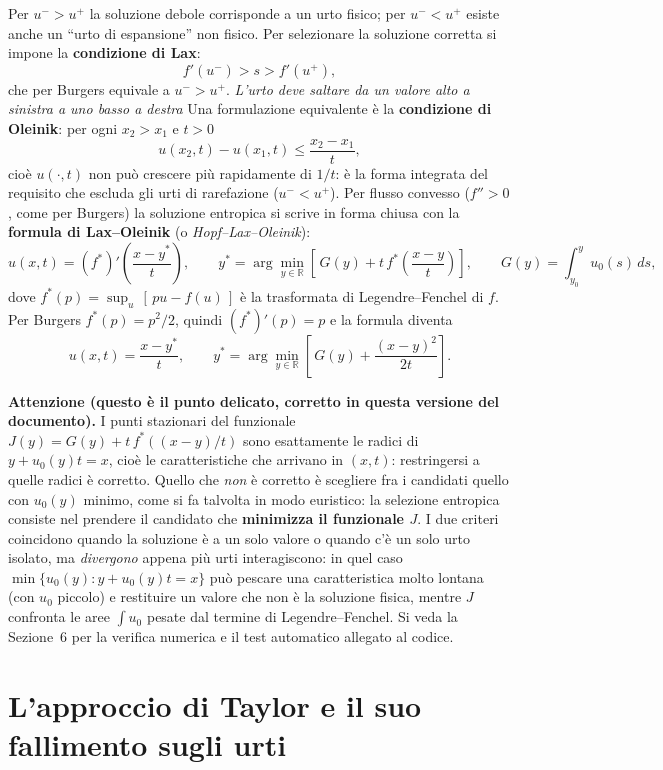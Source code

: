 \documentclass[12pt]{article}
\begin{document}
Per $u^->u^+$ la soluzione debole corrisponde a un urto fisico; per $u^-<u^+$
esiste anche un ``urto di espansione'' non fisico. Per selezionare la soluzione
corretta si impone la \textbf{condizione di Lax}:
\[
f'(u^-) > s > f'(u^+),
\]
che per Burgers equivale a $u^->u^+$.
\newline
\textit{L'urto deve saltare da un valore alto a sinistra a uno basso a destra}
\newline
Una formulazione equivalente è la \textbf{condizione di Oleinik}: per ogni $x_2>x_1$ e $t>0$
\[
u(x_2,t)-u(x_1,t) \le \frac{x_2-x_1}{t},
\]
cioè $u(\cdot,t)$ non può crescere più rapidamente di $1/t$: è la forma integrata del
requisito che escluda gli urti di rarefazione ($u^-<u^+$).
Per flusso convesso ($f''>0$, come per Burgers) la soluzione entropica si scrive in forma
chiusa con la \textbf{formula di Lax--Oleinik} (o \emph{Hopf--Lax--Oleinik}):
\[
u(x,t) = (f^*)'\!\left(\frac{x-y^*}{t}\right), \qquad
y^* = \arg\min_{y\in\mathbb{R}}\left[\, G(y) + t\,f^*\!\left(\frac{x-y}{t}\right)\right],
\qquad G(y)=\int_{y_0}^{y} u_0(s)\,ds,
\]
dove $f^*(p)=\sup_u\,[\,pu-f(u)\,]$ è la trasformata di Legendre--Fenchel di $f$. Per
Burgers $f^*(p)=p^2/2$, quindi $(f^*)'(p)=p$ e la formula diventa
\[
u(x,t) = \frac{x-y^*}{t}, \qquad
y^* = \arg\min_{y\in\mathbb{R}}\left[\, G(y) + \frac{(x-y)^2}{2t}\right].
\]

\textbf{Attenzione (questo è il punto delicato, corretto in questa versione del documento).}
I punti stazionari del funzionale $J(y)=G(y)+t\,f^*((x-y)/t)$ sono esattamente le radici di
$y+u_0(y)t=x$, cioè le caratteristiche che arrivano in $(x,t)$: restringersi a quelle radici
è corretto. Quello che \emph{non} è corretto è scegliere fra i candidati quello con $u_0(y)$
minimo, come si fa talvolta in modo euristico: la selezione entropica consiste nel prendere
il candidato che \textbf{minimizza il funzionale $J$}. I due criteri coincidono quando la
soluzione è a un solo valore o quando c'è un solo urto isolato, ma \emph{divergono} appena
più urti interagiscono: in quel caso $\min\{u_0(y): y+u_0(y)t=x\}$ può pescare una
caratteristica molto lontana (con $u_0$ piccolo) e restituire un valore che non è la
soluzione fisica, mentre $J$ confronta le aree $\int u_0$ pesate dal termine di
Legendre--Fenchel.
Si veda la Sezione~6 per la verifica numerica e il test automatico allegato al codice.


\newpage

\section{L'approccio di Taylor e il suo fallimento sugli urti}
\end{document}

